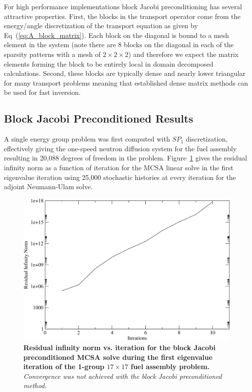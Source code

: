 For high performance implementations block Jacobi preconditioning has
several attractive properties. First, the blocks in the transport
operator come from the energy/angle discretization of the transport
equation as given by Eq~(\ref{eq:A_block_matrix}). Each block on the
diagonal is bound to a mesh element in the system (note there are 8
blocks on the diagonal in each of the sparsity patterns with a mesh of
$2 \times 2 \times 2$) and therefore we expect the matrix elements
forming the block to be entirely local in domain decomposed
calculations. Second, these blocks are typically dense and nearly
lower triangular for many transport problems meaning that established
dense matrix methods can be used for fast inversion.

\subsection{Block Jacobi Preconditioned Results}
\label{subsec:jacobi_prec_assembly_calc}
A single energy group problem was first computed with
$SP_1$ discretization, effectively giving the one-speed neutron
diffusion system for the fuel assembly resulting in 20,088 degrees of
freedom in the problem. Figure~\ref{fig:block_jacobi_res_mcsa} gives
the residual infinity norm as a function of iteration for the MCSA
linear solve in the first eigenvalue iteration using 25,000 stochastic
histories at every iteration for the adjoint Neumann-Ulam solve.

\begin{figure}[t!]
  \begin{center}
    \includegraphics[width=5in]{chapters/spn_equations/block_jacobi_res.pdf}
  \end{center}
  \caption{\textbf{Residual infinity norm vs. iteration for the block
      Jacobi preconditioned MCSA solve during the first eigenvalue
      iteration of the 1-group $17 \times 17$ fuel assembly problem.}
    \textit{Convergence was not achieved with the block Jacobi
      preconditioned method.}}
  \label{fig:block_jacobi_res_mcsa}
\end{figure}

